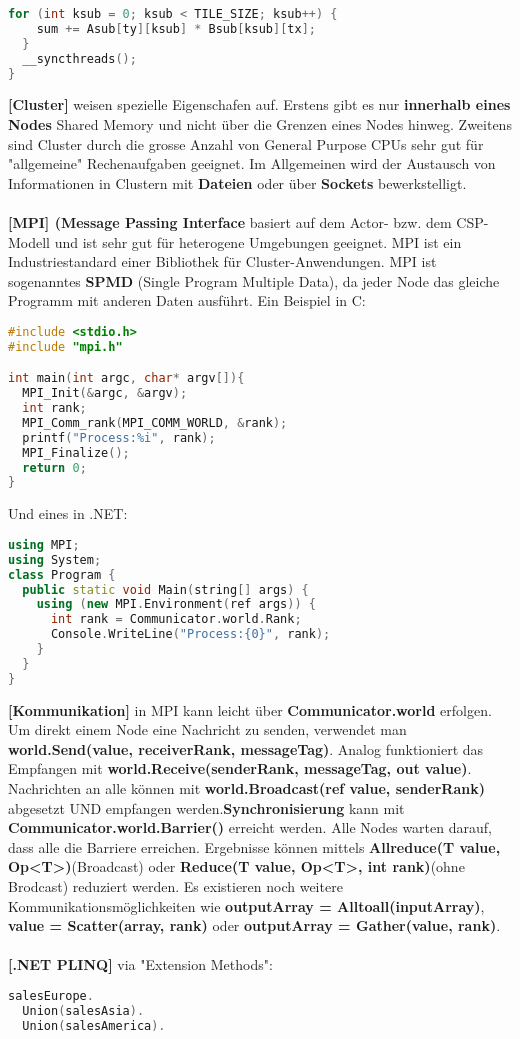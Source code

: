 \documentclass[8pt]{extarticle}
\let\oldtextbf\textbf
\renewcommand{\textbf}{\tiny\oldtextbf}
\begin{document}
\begin{multicols*}{5}
\begin{lstlisting}[language=c]
  for (int ksub = 0; ksub < TILE_SIZE; ksub++) {
    sum += Asub[ty][ksub] * Bsub[ksub][tx];
  }
  __syncthreads();
}
\end{lstlisting}
\textbf{[Cluster]} weisen spezielle Eigenschafen auf. Erstens gibt es nur \textbf{innerhalb eines Nodes} Shared Memory und nicht über die Grenzen eines Nodes hinweg. Zweitens sind Cluster durch die grosse Anzahl von General Purpose CPUs sehr gut für "allgemeine" Rechenaufgaben geeignet. Im Allgemeinen wird der Austausch von Informationen in Clustern mit \textbf{Dateien} oder über \textbf{Sockets} bewerkstelligt.\\\\
\textbf{[MPI] (Message Passing Interface} basiert auf dem Actor- bzw. dem CSP-Modell und ist sehr gut für heterogene Umgebungen geeignet. MPI ist ein Industriestandard einer Bibliothek für Cluster-Anwendungen. MPI ist sogenanntes \textbf{SPMD} (Single Program Multiple Data), da jeder Node das gleiche Programm mit anderen Daten ausführt. Ein Beispiel in C:
\begin{lstlisting}[language=c]
#include <stdio.h>
#include "mpi.h"

int main(int argc, char* argv[]){
  MPI_Init(&argc, &argv);
  int rank;
  MPI_Comm_rank(MPI_COMM_WORLD, &rank);
  printf("Process:%i", rank);
  MPI_Finalize();
  return 0;
}
\end{lstlisting}
Und eines in .NET:
\begin{lstlisting}[language=c++]
using MPI;
using System;
class Program {
  public static void Main(string[] args) {
    using (new MPI.Environment(ref args)) {
      int rank = Communicator.world.Rank;
      Console.WriteLine("Process:{0}", rank);
    }
  }
}
\end{lstlisting}
\textbf{[Kommunikation]} in MPI kann leicht über \textbf{Communicator.world} erfolgen. Um direkt einem Node eine Nachricht zu senden, verwendet man \textbf{world.Send(value, receiverRank, messageTag)}. Analog funktioniert das Empfangen mit \textbf{world.Receive(senderRank, messageTag, out value)}. Nachrichten an alle können mit \textbf{world.Broadcast(ref value, senderRank)} abgesetzt UND empfangen werden.\textbf{Synchronisierung} kann mit \textbf{Communicator.world.Barrier()} erreicht werden. Alle Nodes warten darauf, dass alle die Barriere erreichen. Ergebnisse können mittels \textbf{Allreduce(T value, Op<T>)}(Broadcast) oder \textbf{Reduce(T value, Op<T>, int rank)}(ohne Brodcast) reduziert werden. Es existieren noch weitere Kommunikationsmöglichkeiten wie \textbf{outputArray = Alltoall(inputArray)}, \textbf{value = Scatter(array, rank)} oder \textbf{outputArray = Gather(value, rank)}.\\\\
\textbf{[.NET PLINQ]} via "Extension Methods":
\begin{lstlisting}[language=c++]
salesEurope.
  Union(salesAsia).
  Union(salesAmerica).


\end{lstlisting}
\end{multicols*}
\end{document}
